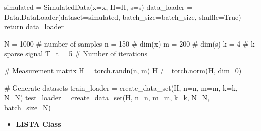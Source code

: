 \documentclass[
  letterpaper,
  DIV=11,
  numbers=noendperiod]{scrartcl}
\newenvironment{Shaded}{\begin{snugshade}}{\end{snugshade}}
\newcommand{\CommentTok}[1]{\textcolor[rgb]{0.46,0.44,0.37}{#1}}
\newcommand{\ControlFlowTok}[1]{\textcolor[rgb]{0.98,0.15,0.45}{#1}}
\newcommand{\DecValTok}[1]{\textcolor[rgb]{0.68,0.51,1.00}{#1}}
\newcommand{\NormalTok}[1]{\textcolor[rgb]{0.97,0.97,0.95}{#1}}
\newcommand{\OperatorTok}[1]{\textcolor[rgb]{0.97,0.97,0.95}{#1}}
\newcommand{\VariableTok}[1]{\textcolor[rgb]{0.97,0.97,0.95}{#1}}
\providecommand{\tightlist}{%
  \setlength{\itemsep}{0pt}\setlength{\parskip}{0pt}}
\begin{document}
\begin{Shaded}
\begin{Highlighting}[]
\NormalTok{    simulated }\OperatorTok{=}\NormalTok{ SimulatedData(x}\OperatorTok{=}\NormalTok{x, H}\OperatorTok{=}\NormalTok{H, s}\OperatorTok{=}\NormalTok{s)}
\NormalTok{    data\_loader }\OperatorTok{=}\NormalTok{ Data.DataLoader(dataset}\OperatorTok{=}\NormalTok{simulated, batch\_size}\OperatorTok{=}\NormalTok{batch\_size, shuffle}\OperatorTok{=}\VariableTok{True}\NormalTok{)}
    \ControlFlowTok{return}\NormalTok{ data\_loader}

\NormalTok{N }\OperatorTok{=} \DecValTok{1000} \CommentTok{\# number of samples}
\NormalTok{n }\OperatorTok{=} \DecValTok{150} \CommentTok{\# dim(x)}
\NormalTok{m }\OperatorTok{=} \DecValTok{200} \CommentTok{\# dim(s)}
\NormalTok{k }\OperatorTok{=} \DecValTok{4} \CommentTok{\# k{-}sparse signal}
\NormalTok{T\_t }\OperatorTok{=} \DecValTok{5}  \CommentTok{\# Number of iterations}

\CommentTok{\# Measurement matrix}
\NormalTok{H }\OperatorTok{=}\NormalTok{ torch.randn(n, m)}
\NormalTok{H }\OperatorTok{/=}\NormalTok{ torch.norm(H, dim}\OperatorTok{=}\DecValTok{0}\NormalTok{)}

\CommentTok{\# Generate datasets}
\NormalTok{train\_loader }\OperatorTok{=}\NormalTok{ create\_data\_set(H, n}\OperatorTok{=}\NormalTok{n, m}\OperatorTok{=}\NormalTok{m, k}\OperatorTok{=}\NormalTok{k, N}\OperatorTok{=}\NormalTok{N)}
\NormalTok{test\_loader }\OperatorTok{=}\NormalTok{ create\_data\_set(H, n}\OperatorTok{=}\NormalTok{n, m}\OperatorTok{=}\NormalTok{m, k}\OperatorTok{=}\NormalTok{k, N}\OperatorTok{=}\NormalTok{N, batch\_size}\OperatorTok{=}\NormalTok{N)}
\end{Highlighting}
\end{Shaded}

\begin{itemize}
\tightlist
\item
  \textbf{LISTA Class}
\end{itemize}
\end{document}
